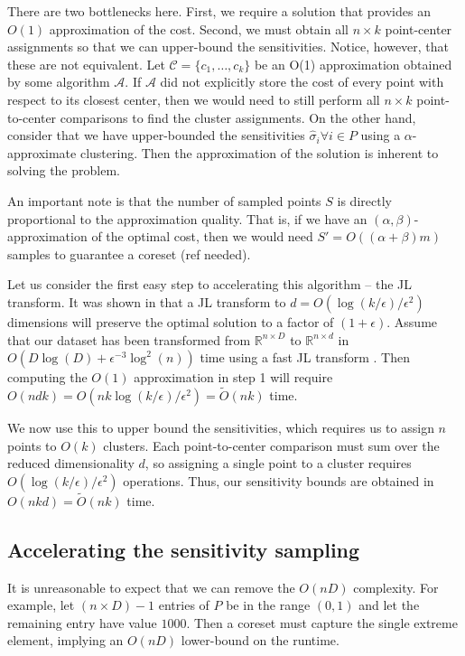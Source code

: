 \documentclass{article}
\theoremstyle{definition}
\begin{document}
There are two bottlenecks here. First, we require a solution that provides an $O(1)$ approximation of the cost. Second, we must obtain all $n \times k$
point-center assignments so that we can upper-bound the sensitivities. Notice, however, that these are not equivalent.
Let $\mathcal{C} = \{ c_1, \dots, c_k \} $ be an O(1) approximation obtained by some algorithm $\mathcal{A}$. If
$\mathcal{A}$ did not explicitly store the cost of every point with respect to its closest center, then we would need to still perform all $n \times k$
point-to-center comparisons to find the cluster assignments. On the other hand, consider that we have upper-bounded the sensitivities $\hat{\sigma}_i \forall
i \in P$ using a $\alpha$-approximate clustering. Then the approximation of the solution is inherent to solving the problem.

An important note is that the number of sampled points $S$ is directly proportional to the approximation quality. That is, if we have an $(\alpha,
\beta)$-approximation of the optimal cost, then we would need $S' = O( (\alpha + \beta) m)$ samples to guarantee a coreset (ref needed).

Let us consider the first easy step to accelerating this algorithm -- the JL transform. It was shown in \cite{makarychev2019performance} that
a JL transform to $d = O(\log(k / \epsilon) / \epsilon^2)$ dimensions will preserve the optimal solution to a factor of $(1+\epsilon)$.
Assume that our dataset has been transformed from $\mathbb{R}^{n \times D}$ to $\mathbb{R}^{n \times d}$ in $O(D\log(D) + \epsilon^{-3} \log ^2(n))$ time using
a fast JL transform \cite{thickstunfast}. Then computing the $O(1)$ approximation in step 1 will require $O(ndk) = O(n k \log(k/\epsilon) / \epsilon^2) = \tilde{O}(nk)$
time.

We now use this to upper bound the sensitivities, which requires us to assign $n$ points to $O(k)$ clusters. Each point-to-center comparison must sum
over the reduced dimensionality $d$, so assigning a single point to a cluster requires $O(\log(k / \epsilon) / \epsilon^2)$ operations. Thus, our sensitivity
bounds are obtained in $O(nkd) = \tilde{O}(nk)$ time.

\subsection{Accelerating the sensitivity sampling}

It is unreasonable to expect that we can remove the $O(nD)$ complexity. For example, let $(n \times D) - 1$ entries of $P$ be in the range $(0, 1)$ and let the
remaining entry have value $1000$. Then a coreset must capture the single extreme element, implying an $O(nD)$ lower-bound on the runtime.
\end{document}

